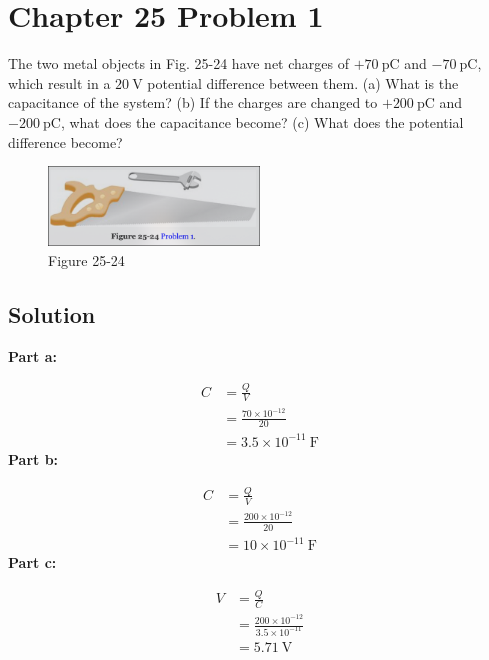 \documentclass{article}
\newcommand{\C}{\text{C}}
\newcommand{\V}{\text{V}}
\newcommand{\p}{\text{p}}
\begin{document}
\section*{Chapter 25 Problem 1}
The two metal objects in Fig. 25-24 have net charges of
$+70\ \p\C$ and $-70\ \p\C$, which result in a $20\ \V$ potential difference
between them. (a) What is the capacitance of the system? (b) If the
charges are changed to $+200\ \p\C$ and $-200\ \p\C$, what does the capacitance become? (c) What does the potential difference become?

\begin{figure}[h]
	\centering
	\includegraphics[width=0.5\textwidth]{image-2.png}
	\caption{Figure 25-24}
\end{figure}

\subsection*{Solution}
\textbf{Part a:}

\begin{align*}
    C &= \frac{Q}{V} \\
    &= \frac{70 \times 10^{-12}}{20} \\
    &= \boxed{3.5 \times 10^{-11}\ \text{F}}
\end{align*}
\textbf{Part b:}

\begin{align*}
    C &= \frac{Q}{V} \\
    &= \frac{200 \times 10^{-12}}{20} \\
    &= \boxed{10 \times 10^{-11}\ \text{F}}
\end{align*}
\textbf{Part c:}

\begin{align*}
    V &= \frac{Q}{C} \\
    &= \frac{200 \times 10^{-12}}{3.5 \times 10^{-11}} \\
    &= \boxed{5.71\ \text{V}}
\end{align*}
\end{document}

